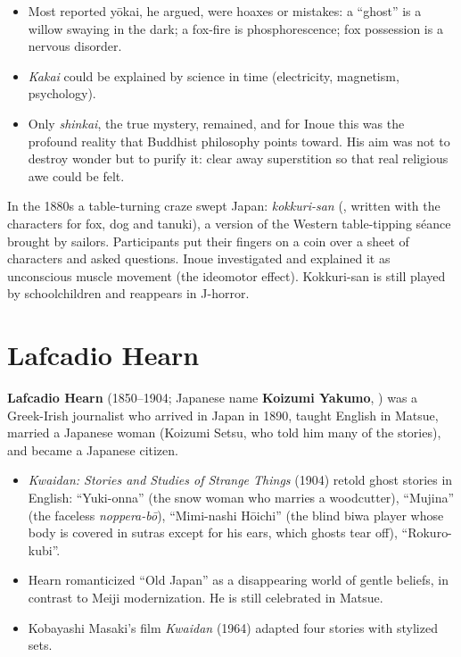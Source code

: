\begin{itemize}
  \item Most reported yōkai, he argued, were hoaxes or mistakes: a ``ghost'' is a willow
        swaying in the dark; a fox-fire is phosphorescence; fox possession is a nervous
        disorder.
  \item \emph{Kakai} could be explained by science in time (electricity, magnetism,
        psychology).
  \item Only \emph{shinkai}, the true mystery, remained, and for Inoue this was the
        profound reality that Buddhist philosophy points toward. His aim was not to destroy
        wonder but to purify it: clear away superstition so that real religious awe could
        be felt.
\end{itemize}

\begin{example}
In the 1880s a table-turning craze swept Japan: \emph{kokkuri-san} (,
written with the characters for fox, dog and tanuki), a version of the Western table-tipping
séance brought by sailors. Participants put their fingers on a coin over a sheet of
characters and asked questions. Inoue investigated and explained it as unconscious muscle
movement (the ideomotor effect). Kokkuri-san is still played by schoolchildren and
reappears in J-horror.
\end{example}

\section{Lafcadio Hearn}

\textbf{Lafcadio Hearn} (1850--1904; Japanese name \textbf{Koizumi Yakumo}, )
was a Greek-Irish journalist who arrived in Japan in 1890, taught English in Matsue,
married a Japanese woman (Koizumi Setsu, who told him many of the stories), and became a
Japanese citizen.

\begin{itemize}
  \item \emph{Kwaidan: Stories and Studies of Strange Things} (1904) retold ghost
        stories in English: ``Yuki-onna'' (the snow woman who marries a woodcutter),
        ``Mujina'' (the faceless \emph{noppera-bō}), ``Mimi-nashi Hōichi'' (the blind
        biwa player whose body is covered in sutras except for his ears, which ghosts tear
        off), ``Rokuro-kubi''.
  \item Hearn romanticized ``Old Japan'' as a disappearing world of gentle beliefs, in
        contrast to Meiji modernization. He is still celebrated in Matsue.
  \item Kobayashi Masaki's film \emph{Kwaidan} (1964) adapted four stories with stylized
        sets.
\end{itemize}

